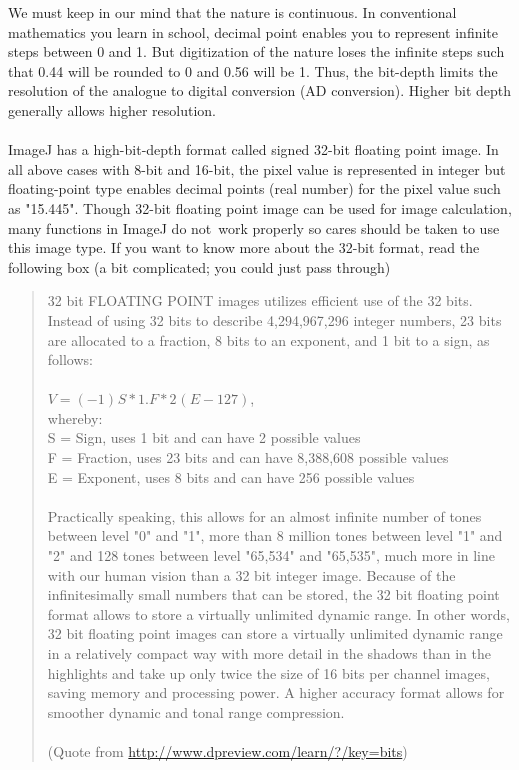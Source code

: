 We must keep in our mind that the nature is continuous. In conventional
mathematics you learn in school, decimal point enables you to represent
infinite steps between 0 and 1. But digitization of the nature loses
the infinite steps such that 0.44 will be rounded to 0 and 0.56 will be
1. Thus, the bit-depth limits the resolution of the analogue to digital
conversion (AD conversion). Higher bit depth generally allows higher
resolution.\\
\\
ImageJ has a high-bit-depth format called signed 32-bit floating point
image. In all above cases with 8-bit and 16-bit, the pixel value is
represented in integer but floating-point type enables decimal points
(real number) for the pixel value such as
"15.445". Though 32-bit floating point
image can be used for image calculation, many functions in ImageJ do
not~work properly so cares should be taken to use this image type. If
you want to know more about the 32-bit format, read the following box
(a bit complicated; you could just pass through)

\begin{quotation}
32 bit FLOATING POINT images utilizes efficient use of the 32 bits.
Instead of using 32 bits to describe 4,294,967,296 integer numbers, 23
bits are allocated to a fraction, 8 bits to an exponent, and 1 bit to a
sign, as follows:\\
~\\
$V = (-1)^{}S * 1.F * 2^{}(E-127)$,\\ 
whereby:\\
S = Sign, uses 1 bit and can have 2 possible values\\
F = Fraction, uses 23 bits and can have 8,388,608 possible
values\\
E = Exponent, uses 8 bits and can have 256 possible values\\
~\\
Practically speaking, this allows for an almost infinite number of tones
between level "0" and
"1", more than 8 million tones between
level "1" and
"2" and 128 tones between level
"65,534" and
"65,535", much more in line with our human
vision than a 32 bit integer image. Because of the infinitesimally
small numbers that can be stored, the 32 bit floating point format
allows to store a virtually unlimited dynamic range. In other words, 32
bit floating point images can store a virtually unlimited dynamic range
in a relatively compact way with more detail in the shadows than in the
highlights and take up only twice the size of 16 bits per channel
images, saving memory and processing power. A higher accuracy format
allows for smoother dynamic and tonal range compression.\\
\\
(Quote from \url{http://www.dpreview.com/learn/?/key=bits})
\end{quotation}




